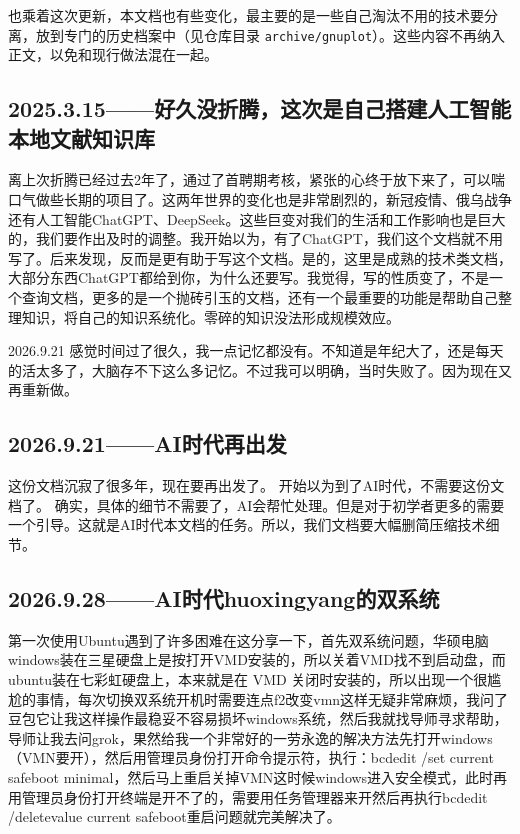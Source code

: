 \documentclass[cn,11pt,chinese,twoside]{elegantbook}
\begin{document}
也乘着这次更新，本文档也有些变化，最主要的是一些自己淘汰不用的技术要分离，放到专门的历史档案中（见仓库目录 \texttt{archive/gnuplot}）。这些内容不再纳入正文，以免和现行做法混在一起。



\subsection*{2025.3.15——好久没折腾，这次是自己搭建人工智能本地文献知识库}
离上次折腾已经过去2年了，通过了首聘期考核，紧张的心终于放下来了，可以喘口气做些长期的项目了。这两年世界的变化也是非常剧烈的，新冠疫情、俄乌战争还有人工智能ChatGPT、DeepSeek。这些巨变对我们的生活和工作影响也是巨大的，我们要作出及时的调整。我开始以为，有了ChatGPT，我们这个文档就不用写了。后来发现，反而是更有助于写这个文档。是的，这里是成熟的技术类文档，大部分东西ChatGPT都给到你，为什么还要写。我觉得，写的性质变了，不是一个查询文档，更多的是一个抛砖引玉的文档，还有一个最重要的功能是帮助自己整理知识，将自己的知识系统化。零碎的知识没法形成规模效应。

2026.9.21 感觉时间过了很久，我一点记忆都没有。不知道是年纪大了，还是每天的活太多了，大脑存不下这么多记忆。不过我可以明确，当时失败了。因为现在又再重新做。



\subsection*{2026.9.21——AI时代再出发}
这份文档沉寂了很多年，现在要再出发了。 开始以为到了AI时代，不需要这份文档了。 确实，具体的细节不需要了，AI会帮忙处理。但是对于初学者更多的需要一个引导。这就是AI时代本文档的任务。所以，我们文档要大幅删简压缩技术细节。



\subsection*{2026.9.28——AI时代huoxingyang的双系统}
第一次使用Ubuntu遇到了许多困难在这分享一下，首先双系统问题，华硕电脑windows装在三星硬盘上是按打开VMD安装的，所以关着VMD找不到启动盘，而ubuntu装在七彩虹硬盘上，本来就是在 VMD 关闭时安装的，所以出现一个很尴尬的事情，每次切换双系统开机时需要连点f2改变vmn这样无疑非常麻烦，我问了豆包它让我这样操作最稳妥不容易损坏windows系统，然后我就找导师寻求帮助，导师让我去问grok，果然给我一个非常好的一劳永逸的解决方法先打开windows（VMN要开），然后用管理员身份打开命令提示符，执行：bcdedit /set {current} safeboot minimal，然后马上重启关掉VMN这时候windows进入安全模式，此时再用管理员身份打开终端是开不了的，需要用任务管理器来开然后再执行bcdedit /deletevalue {current} safeboot重启问题就完美解决了。
\end{document}
